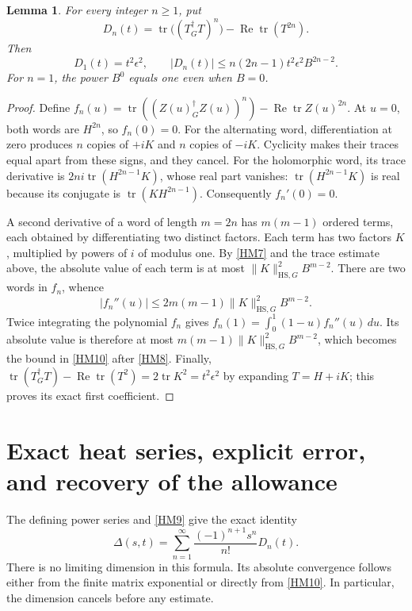 \documentclass[11pt]{article}
\newtheorem{lemma}{Lemma}
\newcommand{\tr}{\operatorname{tr}}
\newcommand{\adj}{\dagger_G}
\newcommand{\Rea}{\operatorname{Re}}
\begin{document}
\begin{lemma}
For every integer \(n\ge1\), put
\begin{equation}
 D_n(t)=\tr\bigl((T^\adj T)^n\bigr)-\Rea\tr(T^{2n}).
 \tag{HM9}\label{HM9}
\end{equation}
Then
\begin{equation}
 D_1(t)=t^2\epsilon^2,\qquad
 |D_n(t)|\le n(2n-1)t^2\epsilon^2 B^{2n-2}.
 \tag{HM10}\label{HM10}
\end{equation}
For \(n=1\), the power \(B^0\) equals one even when \(B=0\).
\end{lemma}
\begin{proof}
Define
\(f_n(u)=\tr((Z(u)^\adj Z(u))^n)-\Rea\tr Z(u)^{2n}\).
At \(u=0\), both words are \(H^{2n}\), so \(f_n(0)=0\).
For the alternating word, differentiation at zero produces \(n\) copies
of \(+iK\) and \(n\) copies of \(-iK\). Cyclicity makes their traces equal
apart from these signs, and they cancel. For the holomorphic word, its trace
derivative is \(2ni\tr(H^{2n-1}K)\), whose real part vanishes:
\(\tr(H^{2n-1}K)\) is real because its conjugate is
\(\tr(KH^{2n-1})\). Consequently \(f_n'(0)=0\).

A second derivative of a word of length \(m=2n\) has \(m(m-1)\) ordered
terms, each obtained by differentiating two distinct factors. Each term
has two factors \(K\), multiplied by powers of \(i\) of modulus one.
By \eqref{HM7} and the trace estimate above, the absolute value of each
term is at most \(\|K\|_{\mathrm{HS},G}^2B^{m-2}\).
There are two words in \(f_n\), whence
\[
 |f_n''(u)|\le2m(m-1)\|K\|_{\mathrm{HS},G}^2B^{m-2}.
\]
Twice integrating the polynomial \(f_n\) gives
\(f_n(1)=\int_0^1(1-u)f_n''(u)\,du\).
Its absolute value is therefore at most
\(m(m-1)\|K\|_{\mathrm{HS},G}^2B^{m-2}\), which becomes the bound
in \eqref{HM10} after \eqref{HM8}.
Finally,
\(\tr(T^\adj T)-\Rea\tr(T^2)=2\tr K^2=t^2\epsilon^2\)
by expanding \(T=H+iK\); this proves its exact first coefficient.
\end{proof}

\section{Exact heat series, explicit error, and recovery of the allowance}

The defining power series and \eqref{HM9} give the exact identity
\begin{equation}
 \Delta(s,t)=\sum_{n=1}^{\infty}
       \frac{(-1)^{n+1}s^n}{n!}D_n(t).
 \tag{HM11}\label{HM11}
\end{equation}
There is no limiting dimension in this formula. Its absolute convergence
follows either from the finite matrix exponential or directly from
\eqref{HM10}. In particular, the dimension cancels before any estimate.
\end{document}
